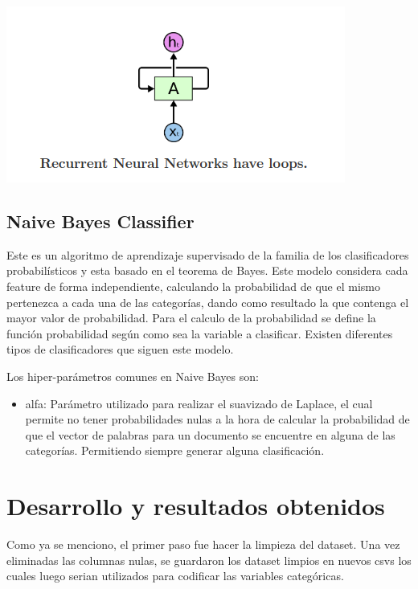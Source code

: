 \documentclass[12pt,a4paper]{article}
\begin{document}
\begin{center}
    \includegraphics[scale=0.5]{imgs/red neuronal recurrente.png}
\end{center}

\subsection{Naive Bayes Classifier}
Este es un algoritmo de aprendizaje supervisado de la familia de los clasificadores probabilísticos y esta basado en el teorema de Bayes.
Este modelo considera cada feature de forma independiente, calculando la probabilidad de que el mismo pertenezca a cada una de las categorías, dando como resultado la que contenga el mayor valor de probabilidad. Para el calculo de la probabilidad se define la función probabilidad según como sea la variable a clasificar. Existen diferentes tipos de clasificadores que siguen este modelo.

Los hiper-parámetros comunes en Naive Bayes son:
\begin{itemize}
    \item alfa: Parámetro utilizado para realizar el suavizado de Laplace, el cual permite no tener probabilidades nulas a la hora de calcular la probabilidad de que el vector de palabras para un documento se encuentre en alguna de las categorías. Permitiendo siempre generar alguna clasificación. 
\end{itemize}

\section{Desarrollo y resultados obtenidos}
Como ya se menciono, el primer paso fue hacer la limpieza del dataset. Una vez eliminadas las columnas nulas, se guardaron los dataset limpios en nuevos csvs los cuales luego serian utilizados para codificar las variables categóricas. \newline
\end{document}
